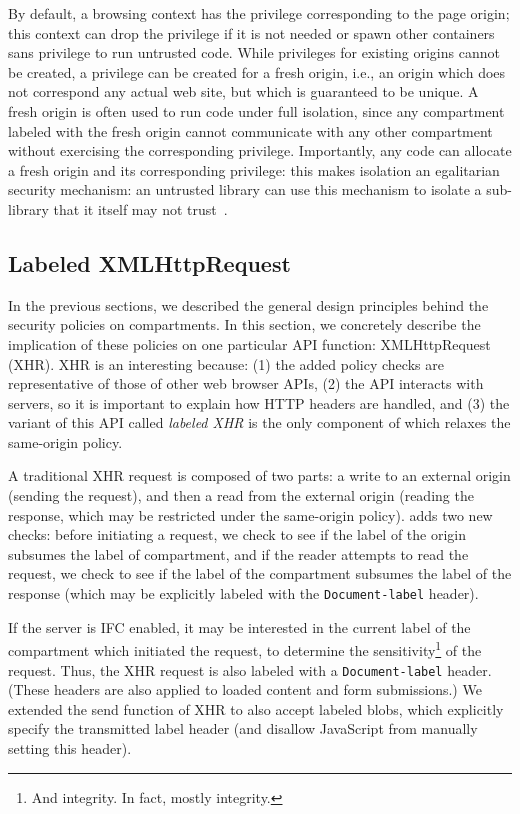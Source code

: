 By default, a browsing context has the privilege corresponding to the
page origin; this context can drop the privilege if it is not
needed or spawn other containers sans privilege to run untrusted code.
%
While privileges for existing origins cannot be created, a privilege can
be created for a fresh origin, i.e., an origin which does not correspond
any actual web site, but which is guaranteed to be unique.
%
A fresh origin is often used to run code under full isolation, since any
compartment labeled with the fresh origin cannot communicate with any
other compartment without exercising the corresponding privilege.
%
Importantly, any code can allocate a fresh origin and its corresponding privilege: this
makes isolation an egalitarian security mechanism: an untrusted library
can use this mechanism to isolate a sub-library that it itself
may not trust~\cite{Zeldovich:2006}.

\subsection{Labeled XMLHttpRequest}
\label{sec:labeled-xhr}

In the previous sections, we described the general design principles
behind the security policies on compartments.
%
In this section, we concretely describe the implication of these
policies on one particular API function: XMLHttpRequest (XHR).
%
XHR is an interesting because: (1) the added \sys{} policy checks are
representative of those of other web browser APIs, (2) the API
interacts with servers, so it is important to explain how HTTP headers are
handled, and (3) the variant of this API called \emph{labeled XHR} is
the only component of \sys{} which relaxes the same-origin policy.

A traditional XHR request is composed of two parts: a write to an
external origin (sending the request), and then a read from the external
origin (reading the response, which may be restricted under the
same-origin policy).
%
\sys{} adds two new checks: before initiating a
request, we check to see if the label of the origin subsumes the label
of compartment, and if the reader attempts to read the request, we check
to see if the label of the compartment subsumes the label of the response
(which may be explicitly labeled with the {\tt Document-label} header).

If the server is IFC enabled, it may be interested in the current label
of the compartment which initiated the request, to determine the
sensitivity\footnote{And integrity. In fact, mostly integrity.} of the request.
%
Thus, the XHR request is also labeled with a {\tt Document-label} header.
%
(These headers are also applied to loaded content and form submissions.)
%
We extended the send function of XHR to also accept labeled blobs,
which explicitly specify the transmitted label header (and disallow
JavaScript from manually setting this header).

